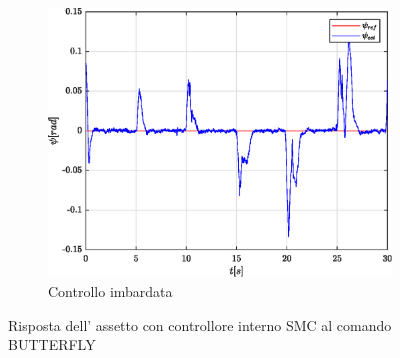 \begin{figure}
\begin{subfigure}{0.45\textwidth}
		\centering
		\includegraphics[width=1\textwidth]{Simulazioni/Figure/SMC/BUTTERFLY/AttitudeControlYaw}
		\caption{Controllo imbardata}
	\end{subfigure}
	\caption{Risposta dell' assetto con controllore interno SMC al comando BUTTERFLY}
\end{figure}

